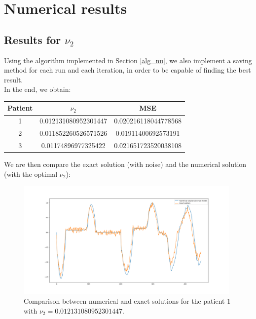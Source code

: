 \documentclass[11pt,a4paper]{article}
\begin{document}
\section{Numerical results}
\label{sec:num_results}
\subsection{Results for $\nu_2$}
Using the algorithm implemented in Section \ref{alg_nu}, we also implement a saving method for each run and each iteration, in order to be capable of finding the best result.\\
In the end, we obtain:
\begin{center}
	\begin{tabular}{|c|c|c|} 
		\hline 
		\rule[-4mm]{0mm}{1cm}
		Patient & $\nu_2$ & MSE \\
		\hline 
		\rule[-4mm]{0mm}{1cm}
		1 & 0.012131080952301447 & 0.020216118044778568 \\
		\hline
		\rule[-4mm]{0mm}{1cm}
		2 &  0.011852260526571526 &
		0.01911400692573191 \\
		\hline 
		\rule[-4mm]{0mm}{1cm}
		3 & 0.01174896977325422 & 0.021651723520038108 \\
		\hline 
	\end{tabular}
\end{center}
We are then compare the exact solution (with noise) and the numerical solution (with the optimal $\nu_2$):
\begin{figure}[H]
\begin{center}
\includegraphics[width = 11cm]{./patient_1_noise.png}
    \caption{Comparison between numerical and exact solutions for the patient 1 with $\nu_2 = 0.012131080952301447$.}
\end{center}
\end{figure}
\end{document}
